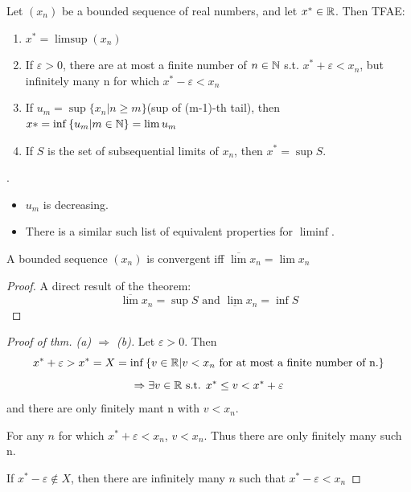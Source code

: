 \documentclass[a4paper,12pt]{article}
\begin{document}
\begin{theorem}
    Let \((x_n)\) be a bounded sequence of real numbers, and let \(x^*\in\mathbb{R}\). Then TFAE:
    \begin{enumerate}
        \item \(x^* = \limsup(x_n)\)
        \item If \(\varepsilon>0\), there are at most a finite number of \(n\in\mathbb{N}\) s.t.
        \(x^*+\varepsilon <x_n\), but infinitely many n for which \(x^* - \varepsilon<x_n\)
        \item If \(u_m=\sup{\{x_n|n\ge m\}}\)(sup of (m-1)-th tail), then \(x*=\inf{\{u_m|m\in\mathbb{N}\}} = \lim{u_m}\)
        \item If \(S\) is the set of subsequential limits of \(x_n\), then \(x^*=\sup S\).\\
    \end{enumerate}

    \begin{remark}
        .
        \begin{itemize}
            \item \(u_m\) is decreasing.
            \item There is a similar such list of equivalent properties for \(\liminf\).\\
        \end{itemize}
    \end{remark}

    \begin{corollary}
        A bounded sequence \((x_n)\) is convergent iff \(\overline{\lim}x_n = \lim x_n\)
        \begin{proof}
            A direct result of the theorem:\[\overline{\lim}x_n=\sup{S} \text{ and } \underline{\lim}x_n=\inf{S}\]
        \end{proof}
    \end{corollary}

    \begin{proof}[Proof of thm. (a) \(\Rightarrow\) (b)]
        Let \(\varepsilon >0\). Then
        \[x^*+\varepsilon>x^* = X =\inf{\{v\in\mathbb{R}| v<x_n \text{ for at most a finite number of n.}\}}\]
        \[\Rightarrow \exists v\in\mathbb{R} \text{ s.t. } x^*\le v < x^*+\varepsilon\]
        and there are only finitely mant n with \(v<x_n\).
        
        For any \(n\) for which \(x^*+\varepsilon < x_n\), \(v<x_n\). Thus there are only finitely many such n.

        If \(x^*-\varepsilon \notin X\), then there are infinitely many \(n\) such that \(x^* - \varepsilon<x_n\)
    \end{proof}
    \newpage


\end{theorem}
\end{document}
